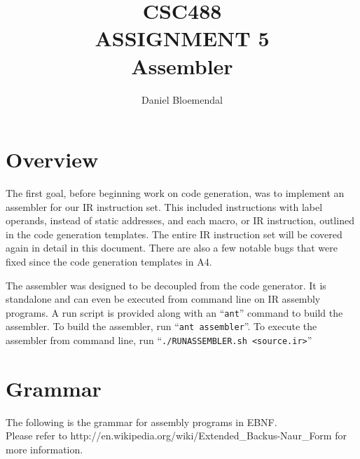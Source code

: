 \documentclass[oneside]{amsart}
\theoremstyle{definition}
\theoremstyle{remark}
\numberwithin{equation}{section}
\begin{document}
\title[CSC488 A5]{CSC488\\ASSIGNMENT 5\\Assembler}
\author{Daniel Bloemendal}

\begin{titlepage}
\maketitle
\thispagestyle{empty}
\tableofcontents
\end{titlepage}

\section{Overview}
The first goal, before beginning work on code generation, was to implement an assembler for our IR
instruction set. This included instructions with label operands, instead of static addresses, and
each macro, or IR instruction, outlined in the code generation templates. The entire IR instruction
set will be covered again in detail in this document. There are also a few notable bugs that were
fixed since the code generation templates in A4.

The assembler was designed to be decoupled from the code generator. It is standalone and can even be
executed from command line on IR assembly programs. A run script is provided along with an
``\texttt{ant}'' command to build the assembler. To build the assembler, run
``\texttt{ant assembler}''. To execute the assembler from command line, run
``\texttt{./RUNASSEMBLER.sh <source.ir>}''

\section{Grammar}
\noindent The following is the grammar for assembly programs in EBNF. \\
Please refer to http://en.wikipedia.org/wiki/Extended_Backus-Naur_Form for more information. \\
\end{document}
